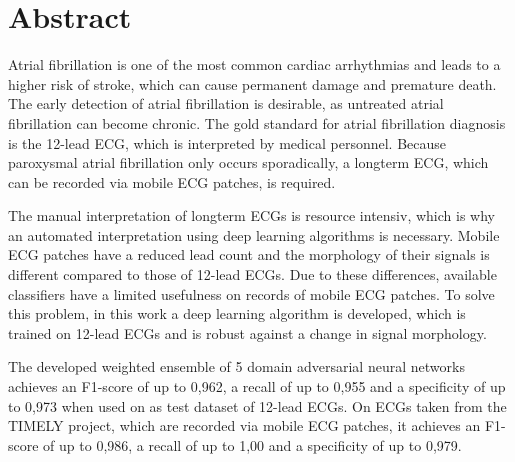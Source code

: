 \chapter*{Abstract}

Atrial fibrillation is one of the most common cardiac arrhythmias and leads to a higher risk of stroke, which can cause permanent damage and premature death. The early detection of atrial fibrillation is desirable, as untreated atrial fibrillation can become chronic. The gold standard for atrial fibrillation diagnosis is the 12-lead ECG, which is interpreted by medical personnel. Because paroxysmal atrial fibrillation only occurs sporadically, a longterm ECG, which can be recorded via mobile ECG patches, is required. 

The manual interpretation of longterm ECGs is resource intensiv, which is why an automated interpretation using deep learning algorithms is necessary. Mobile ECG patches have a reduced lead count and the morphology of their signals is different compared to those of 12-lead ECGs. Due to these differences, available classifiers have a limited usefulness on records of mobile ECG patches. To solve this problem, in this work a deep learning algorithm is developed, which is trained on 12-lead ECGs and is robust against a change in signal morphology.

The developed weighted ensemble of 5 domain adversarial neural networks achieves an F1-score of up to 0,962, a recall of up to 0,955 and a specificity of up to 0,973 when used on as test dataset of 12-lead ECGs. On ECGs taken from the TIMELY project, which are recorded via mobile ECG patches, it achieves an F1-score of up to 0,986, a recall of up to 1,00 and a specificity of up to 0,979.